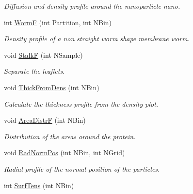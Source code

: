 \begin{DoxyCompactItemize}
\begin{DoxyCompactList}\small\item\em Diffusion and density profile around the nanoparticle  nano. \end{DoxyCompactList}\item 
int \hyperlink{classElPoly_ad6fa03abf69921d9a0759689569e35e9}{WormF} (int Partition, int N\+Bin)\hypertarget{classElPoly_ad6fa03abf69921d9a0759689569e35e9}{}\label{classElPoly_ad6fa03abf69921d9a0759689569e35e9}

\begin{DoxyCompactList}\small\item\em Density profile of a non straight worm shape membrane  worm. \end{DoxyCompactList}\item 
void \hyperlink{classElPoly_aba321cce3649252deca41a462b0e3d38}{StalkF} (int N\+Sample)\hypertarget{classElPoly_aba321cce3649252deca41a462b0e3d38}{}\label{classElPoly_aba321cce3649252deca41a462b0e3d38}

\begin{DoxyCompactList}\small\item\em Separate the leaflets. \end{DoxyCompactList}\item 
void \hyperlink{classElPoly_abcf175509352ac9dd90cb8ad96494219}{Thick\+From\+Dens} (int N\+Bin)
\begin{DoxyCompactList}\small\item\em Calculate the thickness profile from the density plot. \end{DoxyCompactList}\item 
void \hyperlink{classElPoly_a16d58960eae98f1ad67971068f12a22c}{Area\+DistrF} (int N\+Bin)\hypertarget{classElPoly_a16d58960eae98f1ad67971068f12a22c}{}\label{classElPoly_a16d58960eae98f1ad67971068f12a22c}

\begin{DoxyCompactList}\small\item\em Distribution of the areas around the protein. \end{DoxyCompactList}\item 
void \hyperlink{classElPoly_ad3a244bc00c2c8216b1f5cbd36699cdc}{Rad\+Norm\+Pos} (int N\+Bin, int N\+Grid)\hypertarget{classElPoly_ad3a244bc00c2c8216b1f5cbd36699cdc}{}\label{classElPoly_ad3a244bc00c2c8216b1f5cbd36699cdc}

\begin{DoxyCompactList}\small\item\em Radial profile of the normal position of the particles. \end{DoxyCompactList}\item 
int \hyperlink{classElPoly_af9a44196e456df096e96d914e19d85c9}{Surf\+Tens} (int N\+Bin)\hypertarget{classElPoly_af9a44196e456df096e96d914e19d85c9}{}\label{classElPoly_af9a44196e456df096e96d914e19d85c9}


\end{DoxyCompactItemize}
